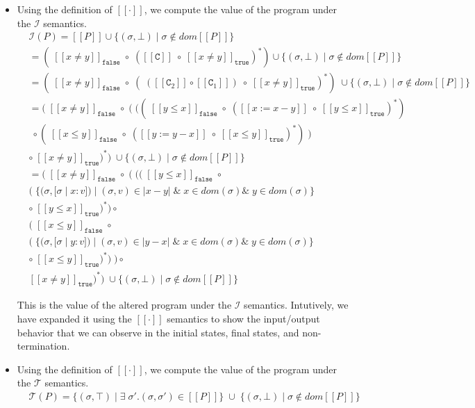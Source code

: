 \documentclass{article}
\newcommand{\C}{\mathtt{C}}
\newcommand{\true}{\mathtt{true}}
\newcommand{\false}{\mathtt{false}}
\begin{document}
\begin{enumerate}
\begin{itemize}
\begin{itemize}
	\item Using the definition of $[[\cdot]]$, we compute the value of the
	program under the $\mathcal{I}$ semantics.
	\begin{align*}	
	& \mathcal{I}(P) = [[ P ]] \cup  \{ (\sigma, \bot) \; | \; \sigma
	\notin dom [[ P ]] \} \\
	& = (\; [[x \neq y]]_{\false} \; \circ \; ([[\C]] \; \circ \; [[x \neq
	y]]_{\true} )^{*} ) \cup  \{ (\sigma, \bot) \; | \; \sigma	\notin dom [[ P ]]
	\}\\
	& = (\; [[x \neq y]]_{\false} \; \circ \; ( \; ( [[\C_2]] \circ [[\C_1]] ) \;
	\circ \; [[x \neq y]]_{\true} )^{*} ) \; \cup  \{ (\sigma, \bot) \; | \; \sigma
	\notin dom [[ P ]] \}\\
	& = (\; [[x \neq y]]_{\false} \; \circ \; ( \; ( 
	(\; [[y \leq x]]_{\false} \; \circ \; ([[x := x - y]] \; \circ \; [[y \leq
	x]]_{\true} )^{*}) \\
	& \; \circ 
	(\; [[x \leq y]]_{\false} \; \circ \; ([[y := y - x]] \; \circ \; [[x \leq
	y]]_{\true} )^{*} ) \; )\\
	& \circ \; [[x \neq y]]_{\true} )^{*} ) \; \cup  \{ (\sigma, \bot) \; | \;
	\sigma \notin dom [[ P ]] \} \\
	& =	(\; [[x \neq y]]_{\false} \; \circ \; ( \; ( 
	(\; [[y \leq x]]_{\false} \; \circ \; \\
	& (\; \{ (\sigma, [\sigma \; | \; x : v]) \; |
	\; (\sigma, v) \in | x - y | \; \& \; x \in dom(\sigma) \& \; y \in dom(\sigma)
	\} \; \\
	& \circ \; [[y \leq x]]_{\true} )^{*}) \circ \\
	& (\; [[x \leq y]]_{\false} \; \circ \; \\
	& (\; \{ (\sigma, [\sigma \; | \; y : v]) \; |
	\; (\sigma, v) \in | y - x | \; \& \; x \in dom(\sigma) \& \; y \in dom(\sigma)
	\} \; \\ 
	& \circ \; [[x \leq y]]_{\true} )^{*} ) \; ) \circ \; \\
	& [[x \neq y]]_{\true} )^{*}) \; \cup  \{ (\sigma, \bot) \; | \; \sigma \notin
	dom [[ P ]] \}
	\end{align*}

	This is the value of the altered program under the $\mathcal{I}$ semantics.
	Intutively, we have expanded it using the $[[\cdot]]$ semantics to
	show the input/output behavior that we can observe in the initial states, final
	states, and non-termination.

	\item Using the definition of $[[\cdot]]$, we compute the value of the
	program under the $\mathcal{T}$ semantics.
	\begin{align*}	
	& \mathcal{T}(P) = \{ ( \sigma, \top ) \; | \; \exists \; \sigma'.(\sigma,
	\sigma') \in [[ P ]] \} \; \cup \; \{ ( \sigma, \bot) \; | \; \sigma \notin dom
	[[ P ]] \} \\
	\end{align*}


\end{itemize}
\end{itemize}
\end{enumerate}
\end{document}
